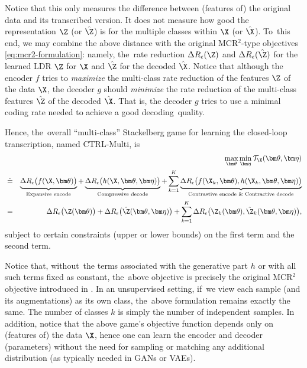 \documentclass[../../book-main.tex]{subfiles}
\begin{document}
Notice that this only measures the difference between (features of) the original data and its transcribed version. It does not measure how good the representation $\Z$ (or $\hat \Z$) is for the multiple classes within $\X$ (or $\hat \X$). To~this end, we may combine the above distance with the original MCR$^2$-type objectives  \eqref{eq:mcr2-formulation}: namely, the~rate reduction $\Delta R_\epsilon(\Z)$ and $\Delta R_\epsilon(\hat \Z)$ for the learned LDR $\Z$ for $\X$ and $\hat \Z$ for the decoded $\hat \X$. Notice that although the encoder $f$ tries to {\em maximize} the multi-class rate reduction of the features $\Z$ of the data $\X$,  the decoder $g$ should {\em minimize} the rate reduction of the multi-class features $\hat \Z$ of the decoded $\hat \X$. That is, the decoder $g$ tries to use a minimal coding rate needed to achieve a good decoding~quality. 

Hence, the~overall ``multi-class''  Stackelberg game for learning the closed-loop transcription, named CTRL-Multi, is
\begin{eqnarray}
&&\max_{\bm \theta} \min_{\bm \eta} \mathcal{T}_{\X}(\bm \theta, \bm \eta) \\
&\doteq& \underbrace{\Delta R_\epsilon\big(f(\X,\bm \theta)\big)}_{\text{Expansive encode}} + \underbrace{\Delta R_\epsilon\big(h(\X,\bm \theta, \bm \eta)\big)}_{\text{Compressive decode}} + \sum_{k=1}^K \underbrace{\Delta R_\epsilon\big(f(\X_k,\bm \theta), h(\X_k,\bm \theta,\bm \eta)\big)}_{\text{Contrastive encode \& Contractive decode}}   \\
&=& \Delta R_\epsilon\big(\Z(\bm \theta) \big) + \Delta R_\epsilon\big(\hat \Z(\bm \theta, \bm \eta)\big) + \sum_{k=1}^K \Delta R_\epsilon\big(\Z_k(
\bm \theta), \hat \Z_k(\bm \theta, \bm \eta) \big),
    \label{eq:MCR2-GAN-objective}
\end{eqnarray}
subject to certain constraints (upper or lower bounds) on the first term and the second term.  %



Notice that, without~the terms associated with the generative part $h$ or with all such terms fixed as constant, the~above objective is precisely the original MCR$^2$ objective introduced in . In an unsupervised setting, if~we view each sample (and its augmentations) as its own class, the~above formulation remains exactly the same. The number of classes $k$ is simply the number of independent samples. In addition, notice that the above game's objective function depends only on (features of) the data $\X$, hence one can learn the encoder and decoder (parameters) without the need for sampling or matching any additional distribution (as typically needed in GANs or VAEs).
\end{document}
